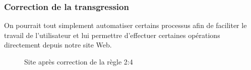 \documentclass{article}[12pt]
\begin{document}
    \subsubsection*{Correction de la transgression}
    On pourrait tout simplement automatiser certains processus afin de faciliter le travail de l'utilisateur et lui permettre d'effectuer certaines opérations directement depuis notre site Web.
     \begin{figure}[H]
    	\centering
        \caption{Site après correction de la règle 2:4}
    \end{figure}
\end{document}
